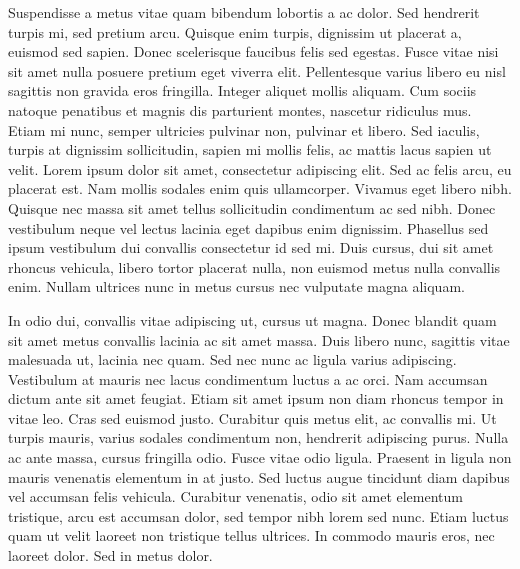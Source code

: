 Suspendisse a metus vitae quam bibendum lobortis a ac dolor. Sed
hendrerit turpis mi, sed pretium arcu. Quisque enim turpis, dignissim
ut placerat a, euismod sed sapien. Donec scelerisque faucibus felis
sed egestas. Fusce vitae nisi sit amet nulla posuere pretium eget
viverra elit. Pellentesque varius libero eu nisl sagittis non gravida
eros fringilla. Integer aliquet mollis aliquam. Cum sociis natoque
penatibus et magnis dis parturient montes, nascetur ridiculus
mus. Etiam mi nunc, semper ultricies pulvinar non, pulvinar et
libero. Sed iaculis, turpis at dignissim sollicitudin, sapien mi
mollis felis, ac mattis lacus sapien ut velit. Lorem ipsum dolor sit
amet, consectetur adipiscing elit. Sed ac felis arcu, eu placerat
est. Nam mollis sodales enim quis ullamcorper. Vivamus eget libero
nibh. Quisque nec massa sit amet tellus sollicitudin condimentum ac
sed nibh. Donec vestibulum neque vel lectus lacinia eget dapibus enim
dignissim. Phasellus sed ipsum vestibulum dui convallis consectetur id
sed mi. Duis cursus, dui sit amet rhoncus vehicula, libero tortor
placerat nulla, non euismod metus nulla convallis enim. Nullam
ultrices nunc in metus cursus nec vulputate magna aliquam.

In odio dui, convallis vitae adipiscing ut, cursus ut magna. Donec
blandit quam sit amet metus convallis lacinia ac sit amet massa. Duis
libero nunc, sagittis vitae malesuada ut, lacinia nec quam. Sed nec
nunc ac ligula varius adipiscing. Vestibulum at mauris nec lacus
condimentum luctus a ac orci. Nam accumsan dictum ante sit amet
feugiat. Etiam sit amet ipsum non diam rhoncus tempor in vitae
leo. Cras sed euismod justo. Curabitur quis metus elit, ac convallis
mi. Ut turpis mauris, varius sodales condimentum non, hendrerit
adipiscing purus. Nulla ac ante massa, cursus fringilla odio. Fusce
vitae odio ligula. Praesent in ligula non mauris venenatis elementum
in at justo. Sed luctus augue tincidunt diam dapibus vel accumsan
felis vehicula. Curabitur venenatis, odio sit amet elementum
tristique, arcu est accumsan dolor, sed tempor nibh lorem sed
nunc. Etiam luctus quam ut velit laoreet non tristique tellus
ultrices. In commodo mauris eros, nec laoreet dolor. Sed in metus
dolor.



